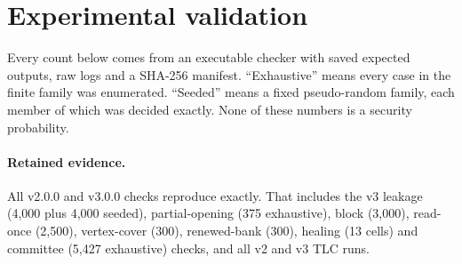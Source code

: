 \documentclass[pdflatex,sn-mathphys-num]{sn-jnl}
\theoremstyle{plain}
\theoremstyle{definition}
\begin{document}
\section{Experimental validation}\label{sec:evidence}

Every count below comes from an executable checker with saved expected outputs, raw logs and a SHA-256 manifest. ``Exhaustive'' means every case in the finite family was enumerated. ``Seeded'' means a fixed pseudo-random family, each member of which was decided exactly. None of these numbers is a security probability.

\paragraph{Retained evidence.}
All v2.0.0 and v3.0.0 checks reproduce exactly. That includes the v3 leakage (4,000 plus 4,000 seeded), partial-opening (375 exhaustive), block (3,000), read-once (2,500), vertex-cover (300), renewed-bank (300), healing (13 cells) and committee (5,427 exhaustive) checks, and all v2 and v3 TLC runs.
\end{document}
